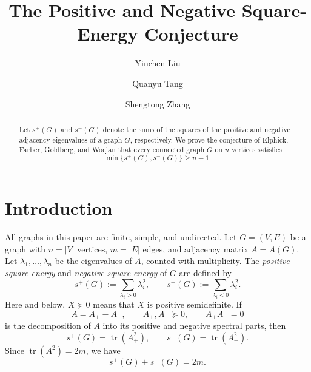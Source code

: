 \documentclass[11pt,letterpaper,reqno]{amsart}
\theoremstyle{definition}
\newcommand{\tr}{\operatorname{tr}}
\begin{document}
\title{The Positive and Negative Square-Energy Conjecture}

\author[Y.~Liu]{Yinchen Liu}
\address{Institute for Interdisciplinary Information Sciences, Tsinghua University, Beijing 100084, P. R. China}

\author[Q.~Tang]{Quanyu Tang}
\address{School of Mathematics and Statistics, Xi'an Jiaotong University, Xi'an 710049, P. R. China}

\author[S.~Zhang]{Shengtong Zhang}
\address{Stanford University, CA, USA}








\begin{abstract}
Let $s^+(G)$ and $s^-(G)$ denote the sums of the squares of the positive
and negative adjacency eigenvalues of a graph $G$, respectively. We prove
the conjecture of Elphick, Farber, Goldberg, and Wocjan that every
connected graph $G$ on $n$ vertices satisfies
\[
    \min\{s^+(G),s^-(G)\}\ge n-1.
\]
\end{abstract}





\maketitle



\section{Introduction}

All graphs in this paper are finite, simple, and undirected.  Let
$G=(V,E)$ be a graph with $n=|V|$ vertices, $m=|E|$ edges, and adjacency
matrix $A=A(G)$.  Let $\lambda_1,\ldots,\lambda_n$ be the eigenvalues of
$A$, counted with multiplicity.  The \emph{positive square energy} and
\emph{negative square energy} of $G$ are defined by
\[
    s^+(G):=\sum_{\lambda_i>0}\lambda_i^2,
    \qquad
    s^-(G):=\sum_{\lambda_i<0}\lambda_i^2.
\]
Here and below, $X\succeq0$ means that $X$ is positive semidefinite.
If
\[
    A=A_+-A_-,
    \qquad
    A_+,A_-\succeq0,
    \qquad
    A_+A_-=0
\]
is the decomposition of $A$ into its positive and negative spectral
parts, then
\[
    s^+(G)=\tr(A_+^2),
    \qquad
    s^-(G)=\tr(A_-^2).
\]
Since $\tr(A^2)=2m$, we have
\begin{equation}\label{eq:trace}
    s^+(G)+s^-(G)=2m.
\end{equation}
\end{document}
